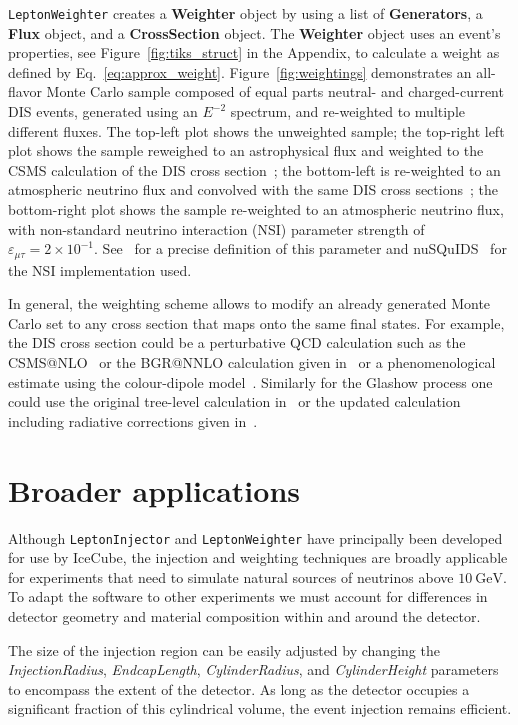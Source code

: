 \documentclass[main.tex]{subfiles}
\newcommand{\LeptonInjector}{\texttt{LeptonInjector}}
\newcommand{\LeptonWeighter}{\texttt{LeptonWeighter}}
\begin{document}
\LeptonWeighter{} creates a \textbf{Weighter} object by using a list of \textbf{Generators}, a \textbf{Flux} object, and a \textbf{CrossSection} object.
The \textbf{Weighter} object uses an event's properties, see Figure~\ref{fig:tiks_struct} in the Appendix, to calculate a weight as defined by Eq.~\eqref{eq:approx_weight}. 
Figure~\ref{fig:weightings} demonstrates an all-flavor Monte Carlo sample composed of equal parts neutral- and charged-current DIS events, generated using an $E^{-2}$ spectrum, and re-weighted to multiple different fluxes.
The top-left plot shows the unweighted sample; the top-right left plot shows the sample reweighed to an astrophysical flux and weighted to the CSMS calculation of the DIS cross section~\cite{CooperSarkar:2011pa}; the bottom-left is re-weighted to an atmospheric neutrino flux and convolved with the same DIS cross sections~\cite{CooperSarkar:2011pa}; the bottom-right plot shows the sample re-weighted to an atmospheric neutrino flux, with non-standard neutrino interaction (NSI) parameter strength of $\varepsilon_{\mu\tau}=2 \times 10^{-1}$.
See~\cite{Dev:2019anc} for a precise definition of this parameter and nuSQuIDS~\cite{Arguelles:2020hss,arguelles:2015nu} for the NSI implementation used.

In general, the weighting scheme allows to modify an already generated Monte Carlo set to any cross section that maps onto the same final states. 
For example, the DIS cross section could be a perturbative QCD calculation such as the CSMS@NLO~\cite{CooperSarkar:2011pa} or the BGR@NNLO calculation given in~\cite{Bertone:2018dse} or a phenomenological estimate using the colour-dipole model~\cite{arguelles:2015nu}. 
Similarly for the Glashow process one could use the original tree-level calculation in~\cite{Glashow:1960zz} or the updated calculation including radiative corrections given in~\cite{Gauld:2019pgt}.

\section{Broader applications}
Although \LeptonInjector{} and \LeptonWeighter{} have principally been developed for use by IceCube, the injection and weighting techniques are broadly applicable for experiments that need to simulate natural sources of neutrinos above $\SI{10}\GeV$.
To adapt the software to other experiments we must account for differences in detector geometry and material composition within and around the detector.

The size of the injection region can be easily adjusted by changing the \textit{InjectionRadius}, \textit{EndcapLength}, \textit{CylinderRadius}, and \textit{CylinderHeight} parameters to encompass the extent of the detector.
As long as the detector occupies a significant fraction of this cylindrical volume, the event injection remains efficient.
\end{document}
